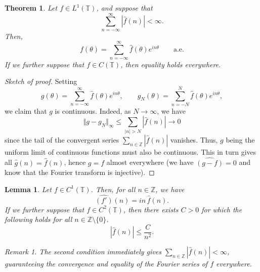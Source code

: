 \documentclass[11pt]{article}
\newtheorem*{theorem}{Theorem}
\newtheorem*{lemma}{Lemma}
\theoremstyle{definition}
\theoremstyle{remark}
\newtheorem*{remark}{Remark}
\begin{document}
    \begin{theorem}
        Let $f \in L^1(\mathbb{T})$, and suppose that \[
            \sum_{n = -\infty}^\infty |\hat{f}(n)| < \infty.
        \] Then, \[
            f(\theta) = \sum_{n = -\infty}^\infty \hat{f}(\theta) e^{in\theta} \qquad
            \text{a.e.}
        \] If we further suppose that $f \in C(\mathbb{T})$, then equality holds
        everywhere.
    \end{theorem}
    \begin{proof}[Sketch of proof]
        Setting \[
            g(\theta) = \sum_{n = -\infty}^\infty \hat{f}(\theta) e^{in\theta},
            \qquad
            g_N(\theta) = \sum_{n = -N}^N \hat{f}(\theta) e^{in\theta},
        \] we claim that $g$ is continuous. Indeed, as $N \to \infty$, we have \[
            \Vert g - g_N\Vert_\infty \leq \sum_{|n| > N} |\hat{f}(n)| \to 0
        \] since the tail of the convergent series $\sum_{n \in \mathbb{Z}}
        |\hat{f}(n)|$ vanishes. Thus, $g$ being the uniform limit of continuous
        functions must also be continuous. This in turn gives all $\hat{g}(n) =
        \hat{f}(n)$, hence $g = f$ almost everywhere (we have $\widehat{(g - f)} = 0$
        and know that the Fourier transform is injective).
    \end{proof}


    \begin{lemma}
        Let $f \in C^1(\mathbb{T})$. Then, for all $n \in \mathbb{Z}$, we have \[
            \widehat{(f')}(n) = in\, \hat{f}(n).
        \] If we further suppose that $f \in C^2(\mathbb{T})$, then there exists $C >
        0$ for which the following holds for all $n \in \mathbb{Z}\setminus\{0\}$. \[
            |\hat{f}(n)| \leq \frac{C}{n^2}.
        \]
        \begin{remark}
            The second condition immediately gives $\sum_{n \in \mathbb{Z}}
            |\hat{f}(n)| < \infty$, guaranteeing the convergence and equality of the
            Fourier series of $f$ everywhere.
        \end{remark}
    \end{lemma}
\end{document}
